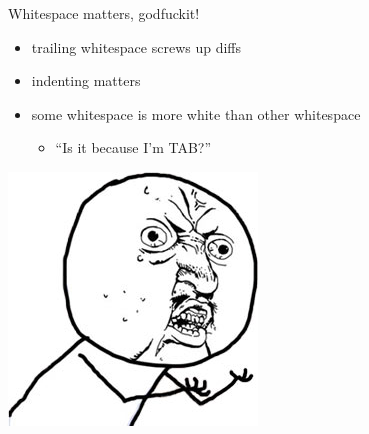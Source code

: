\documentclass{beamer}
\begin{document}
\begin{frame}{Whitespace matters, godfuckit!}
  \pause
  \begin{itemize}
    \item trailing whitespace screws up diffs
    \pause
    \item indenting matters
    \pause
    \item some whitespace is more white than other whitespace
    \pause
    \begin{itemize}
      \item ``Is it because I'm TAB?''
    \end{itemize}
  \end{itemize}
  \pause
  \begin{center}
    \includegraphics[scale=0.5]{yuno}
  \end{center}
\end{frame}
\end{document}
